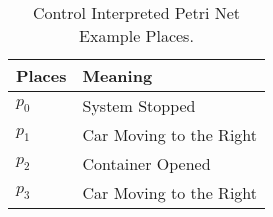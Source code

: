 \begin{table}[htbp]
\caption{Control Interpreted Petri Net Example Places.}
\centering
\begin{tabular}{M{5cm}M{10cm}}
Places & Meaning\\
\hline
\hyperlink{cipnExampleNet:p0m1}{\hypertarget{cipnExampleTable:p0m1}{$p_{0}$}} & System Stopped\\
\hyperlink{cipnExampleNet:p1}{\hypertarget{cipnExampleTable:p1}{$p_{1}$}} & Car Moving to the Right\\
\hyperlink{cipnExampleNet:p2}{\hypertarget{cipnExampleTable:p2}{$p_{2}$}} & Container Opened\\
\hyperlink{cipnExampleNet:p3}{\hypertarget{cipnExampleTable:p3}{$p_{3}$}} & Car Moving to the Right\\
\end{tabular}
\end{table}

